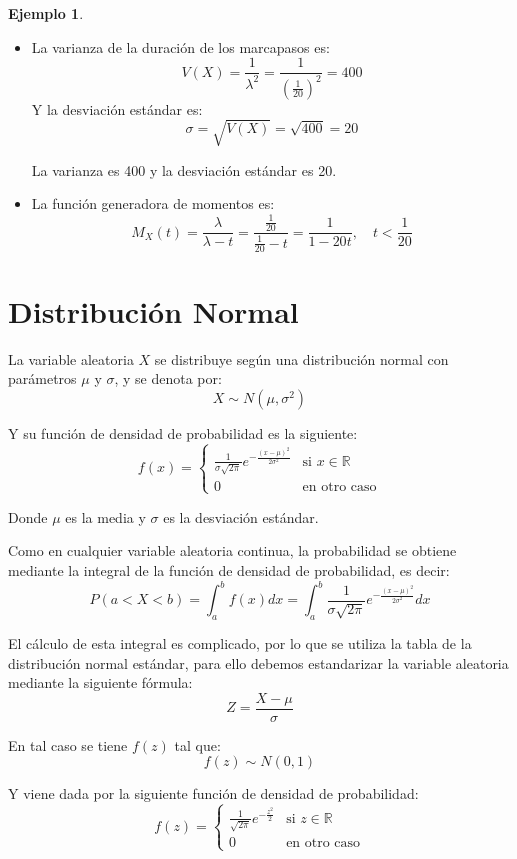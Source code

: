 \documentclass{article}
\theoremstyle{definition}
\newtheorem{example}[definition]{Ejemplo}
\theoremstyle{plain}
\theoremstyle{remark}
\begin{document}
\begin{example}
\begin{itemize}
El cuartil 3 es aproximadamente 27.73 años, lo que significa que el 75\% de los marcapasos duran a lo más 27.73 años.

\item La varianza de la duración de los marcapasos es:
\[
V(X) = \frac{1}{\lambda^2} = \frac{1}{\left(\frac{1}{20}\right)^2} = 400
\]
Y la desviación estándar es:
\[
\sigma = \sqrt{V(X)} = \sqrt{400} = 20
\]

La varianza es 400 y la desviación estándar es 20.

\item La función generadora de momentos es:
\[
M_X(t) = \frac{\lambda}{\lambda - t} = \frac{\frac{1}{20}}{\frac{1}{20} - t} = \frac{1}{1 - 20t}, \quad t < \frac{1}{20}
\]

\end{itemize}

\end{example}

\section{Distribución Normal}
La variable aleatoria $X$ se distribuye según una distribución normal con parámetros $\mu$ y $\sigma$, y se denota por:
\[
X \sim N(\mu, \sigma^2)
\]

Y su función de densidad de probabilidad es la siguiente:
\[
f(x) = \begin{cases}
\frac{1}{\sigma \sqrt{2 \pi}} e^{-\frac{(x - \mu)^2}{2 \sigma^2}} & \text{si } x \in \mathbb{R} \\
0 & \text{en otro caso}
\end{cases}
\]

Donde $\mu$ es la media y $\sigma$ es la desviación estándar.

Como en cualquier variable aleatoria continua, la probabilidad se obtiene mediante la integral de la función de densidad de probabilidad, es decir:
\[
P(a < X < b) = \int_{a}^{b} f(x) dx = \int_{a}^{b} \frac{1}{\sigma \sqrt{2 \pi}} e^{-\frac{(x - \mu)^2}{2 \sigma^2}} dx
\]

El cálculo de esta integral es complicado, por lo que se utiliza la tabla de la distribución normal estándar, para ello debemos estandarizar la variable aleatoria mediante la siguiente fórmula:
\[
Z = \frac{X - \mu}{\sigma}
\]

En tal caso se tiene $f(z)$ tal que:
\[
f(z) \sim N(0, 1)
\]

Y viene dada por la siguiente función de densidad de probabilidad:
\[
f(z) = \begin{cases}
\frac{1}{\sqrt{2 \pi}} e^{-\frac{z^2}{2}} & \text{si } z \in \mathbb{R} \\
0 & \text{en otro caso}
\end{cases}
\]
\end{document}
